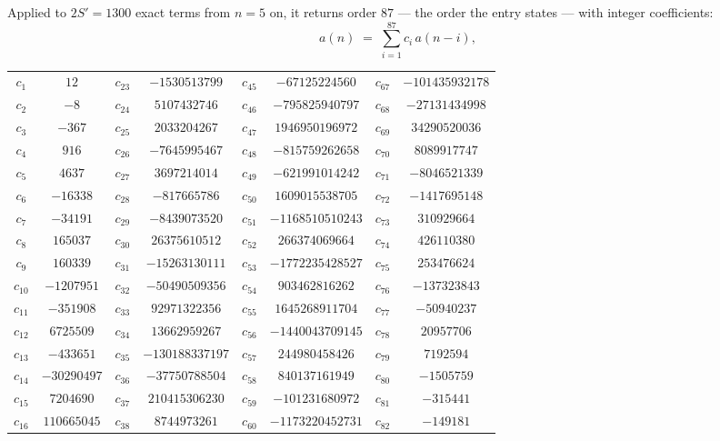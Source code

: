 \documentclass[11pt,a4paper]{article}
\theoremstyle{plain}
\theoremstyle{definition}
\begin{document}
Applied to $2S'=1300$ exact terms from $n=5$ on, it returns order $87$ --- the
order the entry states --- with integer coefficients:
\[
a(n)\;=\;\sum_{i=1}^{87}c_i\,a(n-i),
\]
\begin{center}\small
\begin{tabular}{cccccccc}
$c_{1}$ & $12$ & $c_{23}$ & $-1530513799$ & $c_{45}$ & $-67125224560$ & $c_{67}$ & $-101435932178$ \\
$c_{2}$ & $-8$ & $c_{24}$ & $5107432746$ & $c_{46}$ & $-795825940797$ & $c_{68}$ & $-27131434998$ \\
$c_{3}$ & $-367$ & $c_{25}$ & $2033204267$ & $c_{47}$ & $1946950196972$ & $c_{69}$ & $34290520036$ \\
$c_{4}$ & $916$ & $c_{26}$ & $-7645995467$ & $c_{48}$ & $-815759262658$ & $c_{70}$ & $8089917747$ \\
$c_{5}$ & $4637$ & $c_{27}$ & $3697214014$ & $c_{49}$ & $-621991014242$ & $c_{71}$ & $-8046521339$ \\
$c_{6}$ & $-16338$ & $c_{28}$ & $-817665786$ & $c_{50}$ & $1609015538705$ & $c_{72}$ & $-1417695148$ \\
$c_{7}$ & $-34191$ & $c_{29}$ & $-8439073520$ & $c_{51}$ & $-1168510510243$ & $c_{73}$ & $310929664$ \\
$c_{8}$ & $165037$ & $c_{30}$ & $26375610512$ & $c_{52}$ & $266374069664$ & $c_{74}$ & $426110380$ \\
$c_{9}$ & $160339$ & $c_{31}$ & $-15263130111$ & $c_{53}$ & $-1772235428527$ & $c_{75}$ & $253476624$ \\
$c_{10}$ & $-1207951$ & $c_{32}$ & $-50490509356$ & $c_{54}$ & $903462816262$ & $c_{76}$ & $-137323843$ \\
$c_{11}$ & $-351908$ & $c_{33}$ & $92971322356$ & $c_{55}$ & $1645268911704$ & $c_{77}$ & $-50940237$ \\
$c_{12}$ & $6725509$ & $c_{34}$ & $13662959267$ & $c_{56}$ & $-1440043709145$ & $c_{78}$ & $20957706$ \\
$c_{13}$ & $-433651$ & $c_{35}$ & $-130188337197$ & $c_{57}$ & $244980458426$ & $c_{79}$ & $7192594$ \\
$c_{14}$ & $-30290497$ & $c_{36}$ & $-37750788504$ & $c_{58}$ & $840137161949$ & $c_{80}$ & $-1505759$ \\
$c_{15}$ & $7204690$ & $c_{37}$ & $210415306230$ & $c_{59}$ & $-101231680972$ & $c_{81}$ & $-315441$ \\
$c_{16}$ & $110665045$ & $c_{38}$ & $8744973261$ & $c_{60}$ & $-1173220452731$ & $c_{82}$ & $-149181$ \\

\end{tabular}
\end{center}
\end{document}

